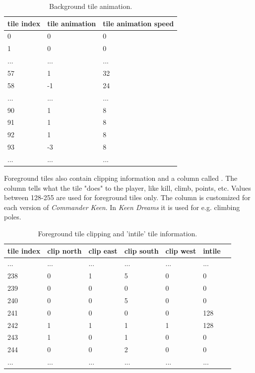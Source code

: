 \documentclass[book.tex]{subfiles}
\begin{document}
 \begin{table}[H]
  \begin{tabularx}{\textwidth}[c]{XXX}
  \hline
  \textbf{tile index} & \textbf{tile animation} & \textbf{tile animation speed}   \\ \hline
  0             & 0          & 0    \\
  1             & 0          & 0    \\
  ...             & ...          & ...    \\
  57             & 1          & 32    \\
  58             & -1          & 24    \\
  ...             & ...          & ...    \\
  90             & 1          & 8    \\
  91            & 1          & 8    \\
  92             & 1          & 8    \\
  93             & -3          & 8    \\
  ...             & ...          & ...    \\
  \end{tabularx}
  \caption{Background tile animation.}
  \label{table:background tile anim}
  \end{table}
  
  \par
Foreground tiles also contain clipping information and a column called . The  column tells what the tile "does" to the player, like kill, climb, points, etc. Values between 128-255 are used for foreground tiles only. The  column is customized for each version of \textit{Commander Keen}. In \textit{Keen Dreams} it is used for e.g. climbing poles.\\
\begin{table}[H]
  \begin{tabularx}{\textwidth}[c]{XXXXXXX}
  \hline
  \textbf{tile index} & \textbf{clip north} & \textbf{clip east} & \textbf{clip south} & \textbf{clip west}  & \textbf{intile} \\ \hline
  ...    & ...     & ...    & ...   & ...     & ...      \\
  238    & 0       & 1      & 5     & 0       & 0        \\
  239    & 0       & 0      & 0     & 0       & 0        \\
  240    & 0       & 0      & 5     & 0       & 0        \\
  241    & 0       & 0      & 0     & 0       & 128       \\
  242    & 1       & 1      & 1     & 1       & 128       \\
  243    & 1       & 0      & 1     & 0       & 0       \\
  244    & 0       & 0      & 2     & 0       & 0       \\
  ...    & ...     & ...    & ...   & ...     & ...     \\
  \end{tabularx}
  \caption{Foreground tile clipping and 'intile' tile information.}
  \end{table}
\end{document}
